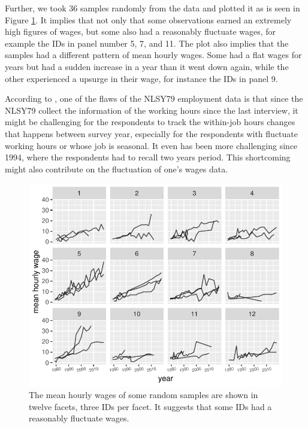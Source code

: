 Further, we took 36 samples randomly from the data and plotted it as is
seen in Figure \ref{fig:sampleplot}. It implies that not only that some
observations earned an extremely high figures of wages, but some also
had a reasonably fluctuate wages, for example the IDs in panel number 5,
7, and 11. The plot also implies that the samples had a different
pattern of mean hourly wages. Some had a flat wages for years but had a
sudden increase in a year than it went down again, while the other
experienced a upsurge in their wage, for instance the IDs in panel 9.

According to \citet{MichaelRPergamit2001DWTN}, one of the flaws of the
NLSY79 employment data is that since the NLSY79 collect the information
of the working hours since the last interview, it might be challenging
for the respondents to track the within-job hours changes that happens
between survey year, especially for the respondents with fluctuate
working hours or whose job is seasonal. It even has been more
challenging since 1994, where the respondents had to recall two years
period. This shortcoming might also contribute on the fluctuation of
one's wages data.

\begin{Schunk}
\begin{figure}
\includegraphics{figures/sampleplot-1} \caption[The mean hourly wages of some random samples are shown in twelve facets, three IDs per facet]{The mean hourly wages of some random samples are shown in twelve facets, three IDs per facet. It suggests that some IDs had a reasonably fluctuate wages.}\label{fig:sampleplot}
\end{figure}
\end{Schunk}

